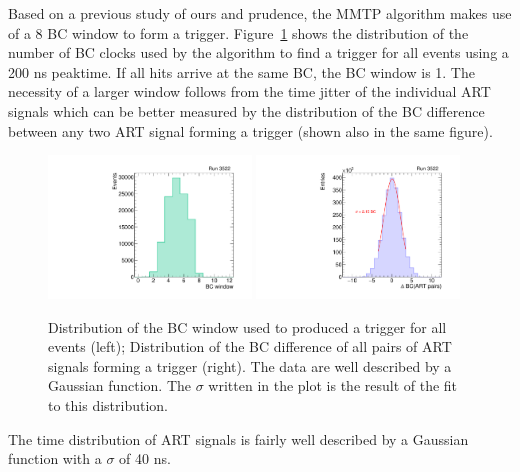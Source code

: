  Based on a previous study of ours and prudence, the MMTP algorithm makes use of a 8 BC window to form a trigger.
  Figure~\ref{fig:time} shows the distribution of the number of BC clocks used by the algorithm to find a trigger for all events
 using a 200 ns peaktime.
  If all hits arrive at the same BC, the BC window is 1. The necessity of a larger window follows from the time jitter
  of the individual ART signals which can be better measured by the distribution of the BC difference between any two ART signal forming a trigger
  (shown also in the same figure). 
\begin{figure}[!htpb]
  \begin{center}
    \includegraphics[width=0.48\textwidth]{figures/gbtanalysis3522/artwin_lin.pdf}
    \includegraphics[width=0.48\textwidth]{figures/gbtanalysis3522/artrpairs_lin.pdf}
  \end{center}
  \vspace{-10pt}
  \caption{Distribution of the BC window used to produced a trigger for all events (left); Distribution of the BC difference of all pairs of ART signals
 forming a trigger (right). The data are  well described by a Gaussian function. The $\sigma$ written in the plot is the result of the fit to this
 distribution.}
  \label{fig:time}
\end{figure}
The time distribution of ART signals is fairly well described by a Gaussian function
 with a $\sigma$ of 40 ns.


